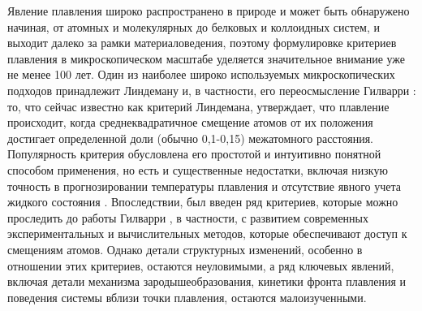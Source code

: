 Явление плавления широко распространено в природе и может быть обнаружено начиная, от атомных и молекулярных до белковых и коллоидных систем, и выходит далеко за рамки материаловедения, поэтому формулировке критериев плавления в микроскопическом масштабе уделяется значительное внимание уже не менее 100 лет.
Один из наиболее широко используемых микроскопических подходов принадлежит Линдеману \cite{lindemann1910} и, в частности, его переосмысление Гилварри \cite{10.1103/physrev.102.308}: то, что сейчас известно как критерий Линдемана, утверждает, что плавление происходит, когда среднеквадратичное смещение атомов от их положения достигает определенной доли (обычно 0,1-0,15) межатомного расстояния.
Популярность критерия обусловлена его простотой и интуитивно понятной способом применения, но есть и существенные недостатки, включая низкую точность в прогнозировании температуры плавления и отсутствие явного учета жидкого состояния \cite{10.1098/rspa.1991.0068}.
Впоследствии, был введен ряд критериев, которые можно проследить до работы Гилварри \cite{10.1063/1.1426419}, в частности, с развитием современных экспериментальных и вычислительных методов, которые обеспечивают доступ к смещениям атомов.
Однако детали структурных изменений, особенно в отношении этих критериев, остаются неуловимыми, а ряд ключевых явлений, включая детали механизма зародышеобразования, кинетики фронта плавления и поведения системы вблизи точки плавления, остаются малоизученными.


